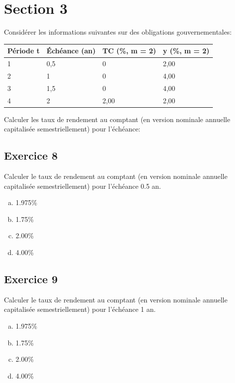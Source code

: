 \documentclass[10pt,a4paper]{article}
\begin{document}
\section*{Section 3}
Considérer les informations suivantes sur des obligations gouvernementales: 

\begin{table}[H]
\begin{center}
\begin{tabular}{|l|l|l|l|}
\hline
Période t & Échéance (an) & TC (\%, m = 2) & y (\%, m = 2) \\ \hline
1         & 0,5           & 0              & 2,00          \\ \hline
2         & 1             & 0              & 4,00          \\ \hline
3         & 1,5           & 0              & 4,00          \\ \hline
4         & 2             & 2,00           & 2,00          \\ \hline
\end{tabular}
\end{center}
\end{table}

Calculer les taux de rendement au comptant (en version nominale annuelle capitalisée semestriellement) pour l'échéance:

\subsection*{Exercice 8}
Calculer le taux de rendement au comptant (en version nominale annuelle capitalisée semestriellement) pour l'échéance 0.5 an.

\begin{enumerate}[a)]
\item 1.975\%
\item 1.75\%
\item 2.00\%
\item 4.00\%
\end{enumerate}



\subsection*{Exercice 9}
Calculer le taux de rendement au comptant (en version nominale annuelle capitalisée semestriellement) pour l'échéance 1 an.

\begin{enumerate}[a)]
\item 1.975\%
\item 1.75\%
\item 2.00\%
\item 4.00\%
\end{enumerate}
\end{document}
